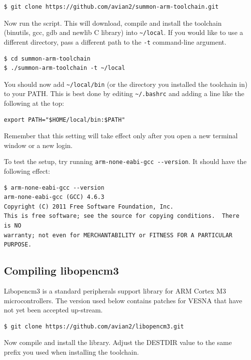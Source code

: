 \documentclass[a4paper, 10pt]{article}
\begin{document}
\begin{verbatim}
$ git clone https://github.com/avian2/summon-arm-toolchain.git
\end{verbatim}

Now run the script. This will download, compile and install the toolchain
(binutils, gcc, gdb and newlib C library) into \verb|~/local|. If you
would like to use a different directory, pass a different path to the
\verb|-t| command-line argument.

\begin{verbatim}
$ cd summon-arm-toolchain
$ ./summon-arm-toolchain -t ~/local
\end{verbatim}

You should now add \verb|~/local/bin| (or the directory you installed the toolchain
in) to your PATH. This is best done by editing \verb|~/.bashrc| and adding a
line like the following at the top:

\begin{verbatim}
export PATH="$HOME/local/bin:$PATH"
\end{verbatim}

Remember that this setting will take effect only after you open a new terminal window or
a new login.

To test the setup, try running \verb|arm-none-eabi-gcc --version|. It should have the
following effect:

\begin{verbatim}
$ arm-none-eabi-gcc --version
arm-none-eabi-gcc (GCC) 4.6.3
Copyright (C) 2011 Free Software Foundation, Inc.
This is free software; see the source for copying conditions.  There is NO
warranty; not even for MERCHANTABILITY or FITNESS FOR A PARTICULAR PURPOSE.
\end{verbatim}

\subsection{Compiling libopencm3}

Libopencm3 is a standard peripherals support library for ARM Cortex M3
microcontrollers. The version used below contains patches for VESNA that have
not yet been accepted up-stream.

\begin{verbatim}
$ git clone https://github.com/avian2/libopencm3.git
\end{verbatim}

Now compile and install the library. Adjust the DESTDIR value to the same prefix
you used when installing the toolchain.
\end{document}
